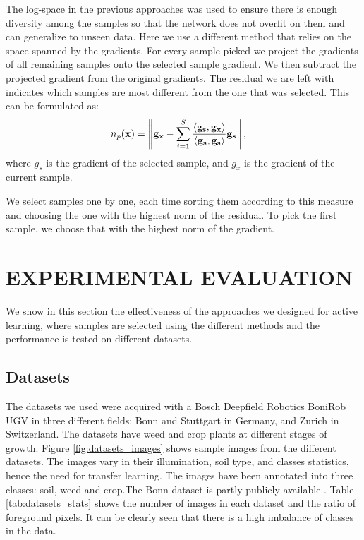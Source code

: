 \documentclass[letterpaper, 10 pt, conference]{ieeeconf}  %
\begin{document}
The log-space in the previous approaches was used to ensure there is enough diversity among the samples so that the network does not overfit on them and can generalize to unseen data. Here we use a different method that relies on the space spanned by the gradients. For every sample picked we project the gradients of all remaining samples onto the selected sample gradient. We then subtract the projected gradient from the original gradients. The residual we are left with indicates which samples are most different from the one that was selected. This can be formulated as:
\begin{align}
n_p(\bold{x}) &=  \left\lVert \bold{g_x} - \sum_{i=1}^S \frac{\left\langle \bold{g_s}, \bold{g_x} \right\rangle}{\left\langle \bold{g_s}, \bold{g_s} \right\rangle} \bold{g_s} \right\rVert,
\end{align}
where $g_s$ is the gradient of the selected sample, and $g_x$ is the gradient of the current sample.

We select samples one by one, each time sorting them according to this measure and choosing the one with the highest norm of the residual. To pick the first sample, we choose that with the highest norm of the gradient.



\section{EXPERIMENTAL EVALUATION}
\label{sec:exp}


We show in this section the effectiveness of the approaches we designed for active learning, where samples are selected using the different methods and the performance is tested on different datasets. 


\subsection{Datasets}

The datasets we used were acquired with a Bosch Deepfield Robotics BoniRob UGV in three different fields: Bonn and Stuttgart in Germany, and Zurich in Switzerland. The datasets have weed and crop plants at different stages of growth. Figure \ref{fig:datasets_images} shows sample images from the different datasets. The images vary in their illumination, soil type, and classes statistics, hence the need for transfer learning. The images have been annotated into three classes: soil, weed and crop.The Bonn dataset is partly publicly available \cite{chebrolu2017agricultural}. Table \ref{tab:datasets_stats} shows the number of images in each dataset and the ratio of foreground pixels. It can be clearly seen that there is a high imbalance of classes in the data.
\end{document}

